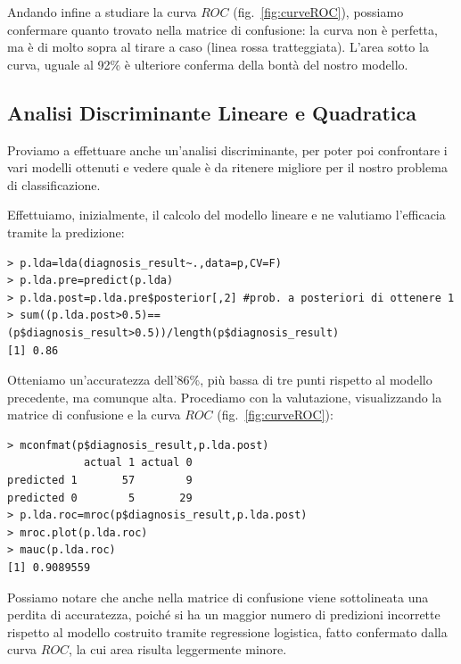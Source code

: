 \documentclass[11pt,a4paper,oneside]{article}
\begin{document}
Andando infine a studiare la curva $ROC$ (fig.~\vref{fig:curveROC}), possiamo confermare quanto trovato nella matrice di confusione: la curva non è perfetta, ma è di molto sopra al tirare a caso (linea rossa tratteggiata). L'area sotto la curva, uguale al 92\% è ulteriore conferma della bontà del nostro modello.

\subsection{Analisi Discriminante Lineare e Quadratica}
Proviamo a effettuare anche un'analisi discriminante, per poter poi confrontare i vari modelli ottenuti e vedere quale è da ritenere migliore per il nostro problema di classificazione.

Effettuiamo, inizialmente, il calcolo del modello lineare e ne valutiamo l'efficacia tramite la predizione:
\begin{verbatim}
> p.lda=lda(diagnosis_result~.,data=p,CV=F)
> p.lda.pre=predict(p.lda)
> p.lda.post=p.lda.pre$posterior[,2] #prob. a posteriori di ottenere 1
> sum((p.lda.post>0.5)==(p$diagnosis_result>0.5))/length(p$diagnosis_result)
[1] 0.86
\end{verbatim}
Otteniamo un'accuratezza dell'86\%, più bassa di tre punti rispetto al modello precedente, ma comunque alta. Procediamo con la valutazione, visualizzando la matrice di confusione e la curva $ROC$ (fig.~\ref{fig:curveROC}):
\begin{verbatim}
> mconfmat(p$diagnosis_result,p.lda.post)
            actual 1 actual 0
predicted 1       57        9
predicted 0        5       29
> p.lda.roc=mroc(p$diagnosis_result,p.lda.post)
> mroc.plot(p.lda.roc)
> mauc(p.lda.roc)
[1] 0.9089559
\end{verbatim}
Possiamo notare che anche nella matrice di confusione viene sottolineata una perdita di accuratezza, poiché si ha un maggior numero di predizioni incorrette rispetto al modello costruito tramite regressione logistica, fatto confermato dalla curva $ROC$, la cui area risulta leggermente minore.
\end{document}
